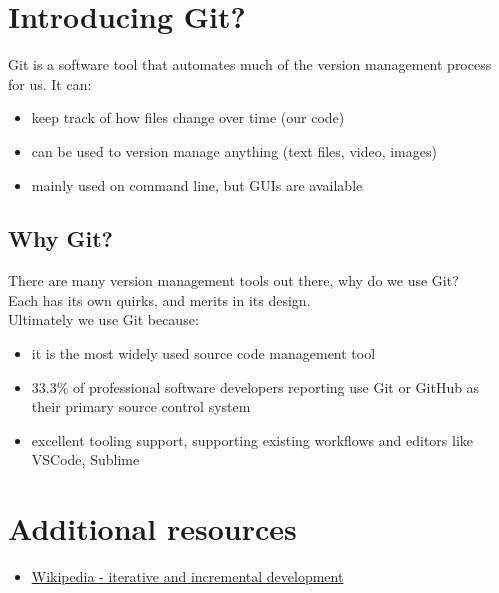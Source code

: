\section{Introducing Git?}

Git is a software tool that automates much of the version management process for us. It can:

\begin{itemize}
    \item keep track of how files change over time (our code)
    \item can be used to version manage anything (text files, video, images)
    \item mainly used on command line, but GUIs are available
\end{itemize}


\subsection{Why Git?}

There are many version management tools out there, why do we use Git?
\\

Each has its own quirks, and merits in its design.
\\

Ultimately we use Git because:

\begin{itemize}
    \item it is the most widely used source code management tool
	\item 33.3\% of professional software developers reporting use Git or GitHub as their primary source control system
	\item excellent tooling support, supporting existing workflows and editors like VSCode, Sublime
\end{itemize}


\section{Additional resources}

\begin{itemize}[leftmargin=*]
    \item \href{https://en.wikipedia.org/wiki/Iterative_and_incremental_development}{Wikipedia - iterative and incremental development }
\end{itemize}